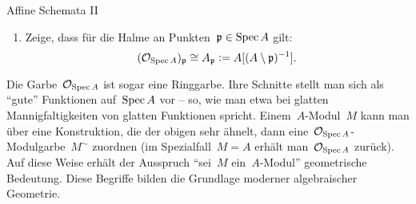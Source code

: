 \documentclass{uebblatt}
\begin{document}
\begin{aufgabe}{Affine Schemata II}
\begin{enumerate}
\item Zeige, dass für die Halme an Punkten~$\mathfrak{p} \in \operatorname{Spec} A$ gilt:
\[ (\mathcal{O}_{\operatorname{Spec} A})_{\mathfrak{p}} \cong A_{\mathfrak{p}} \vcentcolon= A[(A \setminus \mathfrak{p})^{-1}]. \]
\end{enumerate}

{\scriptsize
Die Garbe~$\mathcal{O}_{\operatorname{Spec} A}$ ist sogar eine Ringgarbe. Ihre Schnitte stellt man
sich als "`gute"' Funktionen auf~$\operatorname{Spec} A$ vor -- so, wie man etwa bei glatten
Mannigfaltigkeiten von glatten Funktionen spricht. Einem~$A$-Modul~$M$ kann man
über eine Konstruktion, die der obigen sehr ähnelt, dann eine~$\mathcal{O}_{\operatorname{Spec}
A}$-Modulgarbe~$M^\sim$ zuordnen (im Spezialfall~$M = A$ erhält man~$\mathcal{O}_{\operatorname{Spec}
A}$ zurück). Auf diese Weise erhält der Ausspruch "`sei~$M$ ein~$A$-Modul"'
geometrische Bedeutung. Diese Begriffe bilden die Grundlage moderner
algebraischer Geometrie.\par}
\end{aufgabe}
\end{document}
